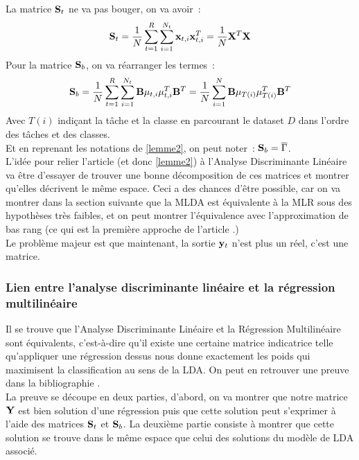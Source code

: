 \documentclass[12pt]{article}
\begin{document}
La matrice ${\bf S}_t$ ne va pas bouger, on va avoir~:
$$
{\bf S}_t = \frac{1}{N} \sum_{t = 1}^{R} \sum_{i = 1}^{N_t} {\bf x}_{t, i}{\bf x}^T_{t, i} = \frac{1}{N}{\bf X}^T{\bf X} 
$$
Pour la matrice ${\bf S}_b$, on va réarranger les termes~:
$$
{\bf S}_b = \frac{1}{N} \sum_{t = 1}^{R}\sum_{i = 1}^{N_t}{\bf B}\mu_{t, i}\mu^T_{t, i}{\bf B}^T = \frac{1}{N} \sum_{i = 1}^{N} {\bf B}\mu_{T(i)}\mu^T_{T(i)}{\bf B}^T
$$
Avec $T(i)$ indiçant la tâche et la classe en parcourant le dataset $D$ dans l'ordre des tâches et des classes.\\
Et en reprenant les notations de \ref{lemme2}, on peut noter~: ${\bf S}_b = \overline{\Gamma}$.\\
L'idée pour relier l'article \cite{MTLR_1} (et donc \ref{lemme2}) à l'Analyse Discriminante Linéaire va être d'essayer de trouver une bonne décomposition de ces matrices et montrer qu'elles décrivent le même espace. Ceci a des chances d'être possible, car on va montrer dans la section suivante que la MLDA est équivalente à la MLR sous des hypothèses très faibles, et on peut montrer \cite{LDA-to-LRR} l'équivalence avec l'approximation de bas rang (ce qui est la première approche de l'article \cite{MTLR_1}.)\\
Le problème majeur est que maintenant, la sortie ${\bf y}_t$ n'est plus un réel, c'est une matrice. 
\subsubsection{Lien entre l'analyse discriminante linéaire et la régression multilinéaire}
Il se trouve que l'Analyse Discriminante Linéaire et la Régression Multilinéaire sont équivalents, c'est-à-dire qu'il existe une certaine matrice indicatrice telle qu'appliquer une régression dessus nous donne exactement les poids qui maximisent la classification au sens de la LDA. On peut en retrouver une preuve dans la bibliographie \cite{LDA-proof}.\\

La preuve se découpe en deux parties, d'abord, on va montrer que notre matrice ${\bf Y}$ est bien solution d'une régression puis que cette solution peut s'exprimer à l'aide des matrices ${\bf S}_t$ et ${\bf S}_b$. La deuxième partie consiste à montrer que cette solution se trouve dans le même espace que celui des solutions du modèle de LDA associé. 
\end{document}
